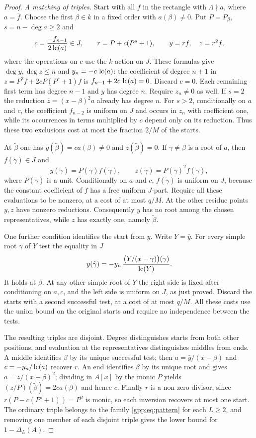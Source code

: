 \begin{proof}
\emph{A matching of triples.} Start with all $f$ in the rectangle with
$\Lambda\nmid a$, where $a=\bar f$. Choose the first $\beta\in k$ in a fixed order with
$a(\beta)\ne0$. Put $P=P_\beta$, $s=n-\deg a\ge2$ and
\[
 c=\frac{-f_{n-1}}{2\operatorname{lc}(a)}\in J,\qquad r=P+c(P^s+1),\qquad y=rf,\quad z=r^2f,
\]
where the operations on $c$ use the $k$-action on $J$. These formulas give
$\deg y,\deg z\le n$ and $y_n=-c\,\operatorname{lc}(a)$: the coefficient of degree $n+1$ in
$z=P^2f+2cP(P^s+1)f$ is $f_{n-1}+2c\,\operatorname{lc}(a)=0$. Discard $c=0$. Each remaining first
term has degree $n-1$ and $y$ has degree $n$. Require $z_n\ne0$ as well. If $s=2$ the
reduction $\bar z=(x-\beta)^2a$ already has degree $n$. For $s>2$, conditionally on $a$
and $c$, the coefficient $f_{n-2}$ is uniform on $J$ and occurs in $z_n$ with coefficient
one, while its occurrences in terms multiplied by $c$ depend only on its reduction. Thus
these two exclusions cost at most the fraction $2/M$ of the starts.

At $\tilde\beta$ one has $y(\tilde\beta)=ca(\beta)\ne0$ and $z(\tilde\beta)=0$. If
$\gamma\ne\beta$ is a root of $a$, then $f(\tilde\gamma)\in J$ and
\[
 y(\tilde\gamma)=P(\tilde\gamma)f(\tilde\gamma),\qquad
 z(\tilde\gamma)=P(\tilde\gamma)^2f(\tilde\gamma),
\]
where $P(\tilde\gamma)$ is a unit. Conditionally on $a$ and $c$, $f(\tilde\gamma)$ is
uniform on $J$, because the constant coefficient of $f$ has a free uniform $J$-part.
Require all these evaluations to be nonzero, at a cost of at most $q/M$. At the other
residue points $y,z$ have nonzero reductions. Consequently $y$ has no root among the
chosen representatives, while $z$ has exactly one, namely $\tilde\beta$.

One further condition identifies the start from $y$. Write $Y=\bar y$. For every simple
root $\gamma$ of $Y$ test the equality in $J$
\[
 y(\tilde\gamma)=-y_n\,\frac{\bigl(Y/(x-\gamma)\bigr)(\gamma)}{\operatorname{lc}(Y)} .
\]
It holds at $\beta$. At any other simple root of $Y$ the right side is fixed after
conditioning on $a,c$, and the left side is uniform on $J$, as just proved. Discard the
starts with a second successful test, at a cost of at most $q/M$. All these costs use the
union bound on the original starts and require no independence between the tests.

The resulting triples are disjoint. Degree distinguishes starts from both other
positions, and evaluation at the representatives distinguishes middles from ends. A
middle identifies $\beta$ by its unique successful test; then $a=\bar y/(x-\beta)$ and
$c=-y_n/\operatorname{lc}(a)$ recover $r$. An end identifies $\beta$ by its unique root and gives
$a=\bar z/(x-\beta)^2$; dividing in $A[x]$ by the monic $P$ yields
$(z/P)(\tilde\beta)=2ca(\beta)$ and hence $c$. Finally $r$ is a non-zero-divisor, since
$r(P-c(P^s+1))=P^2$ is monic, so each inversion recovers at most one start. The ordinary
triple belongs to the family \eqref{gpp:eq:pattern} for each $L\ge2$, and removing one
member of each disjoint triple gives the lower bound for $1-\Delta_L(A)$.
\end{proof}


